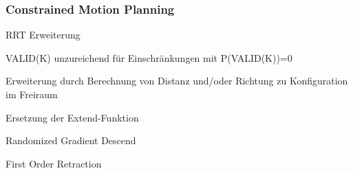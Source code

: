 \subsubsection{Constrained Motion Planning}
\begin{compactitem}
    \item RRT Erweiterung
    \item VALID(K) unzureichend für Einschränkungen mit P(VALID(K))=0
    \item Erweiterung durch Berechnung von Distanz und/oder Richtung zu Konfiguration im Freiraum
    \item Ersetzung der Extend-Funktion
    \begin{compactitem}
        \item Randomized Gradient Descend
        \item First Order Retraction
    \end{compactitem}
\end{compactitem}
